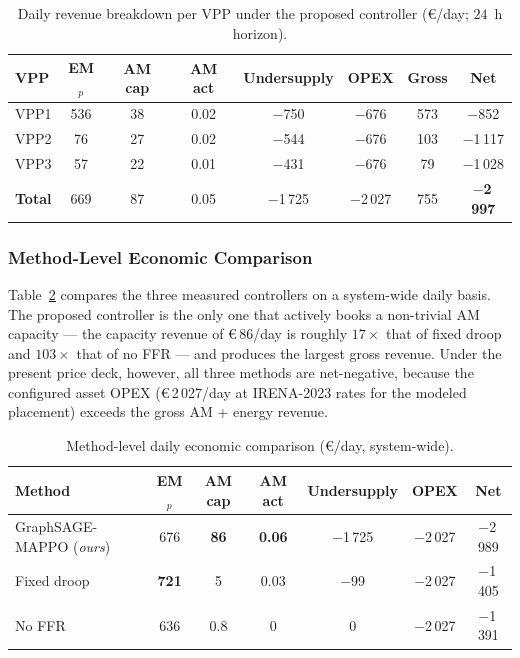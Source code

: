 \begin{table}[!t]
\caption{Daily revenue breakdown per VPP under the proposed
controller (\euro/day; $24$~h horizon).}
\label{tab:revenue_breakdown}
\centering
\footnotesize
\begin{tabular}{lccccccc}
\toprule
VPP & EM$_p$ & AM cap & AM act & Undersupply & OPEX & Gross & Net \\
\midrule
VPP1 & 536 & 38 & 0.02 & $-$750 & $-$676 & 573 & $-$852    \\
VPP2 & 76  & 27 & 0.02 & $-$544 & $-$676 & 103 & $-$1\,117 \\
VPP3 & 57  & 22 & 0.01 & $-$431 & $-$676 & 79  & $-$1\,028 \\
\midrule
\textbf{Total} & 669 & 87 & 0.05 & $-$1\,725 & $-$2\,027 & 755 & $\mathbf{-}$\textbf{2\,997} \\
\bottomrule
\end{tabular}
\end{table}

\subsubsection*{Method-Level Economic Comparison}
Table~\ref{tab:economic_methods} compares the three measured
controllers on a system-wide daily basis. The proposed controller is
the only one that actively books a non-trivial AM capacity --- the
capacity revenue of \euro\,86/day is roughly $17\times$ that of
fixed droop and $103\times$ that of no FFR --- and produces the
largest gross revenue. Under the present price deck, however, all
three methods are net-negative, because the configured asset OPEX
(\euro\,2\,027/day at IRENA-2023 rates for the modeled placement)
exceeds the gross AM + energy revenue.

\begin{table}[!t]
\caption{Method-level daily economic comparison (\euro/day,
system-wide).}
\label{tab:economic_methods}
\centering
\footnotesize
\begin{tabular}{lcccccc}
\toprule
Method & EM$_p$ & AM cap & AM act & Undersupply & OPEX & \textbf{Net} \\
\midrule
GraphSAGE-MAPPO (\emph{ours}) & 676          & \textbf{86} & \textbf{0.06} & $-$1\,725 & $-$2\,027 & $-$2\,989 \\
Fixed droop                   & \textbf{721} & 5           & 0.03          & $-$99     & $-$2\,027 & $-$1\,405 \\
No FFR                        & 636          & 0.8         & 0             & $0$       & $-$2\,027 & $-$1\,391 \\
\bottomrule
\end{tabular}
\end{table}

